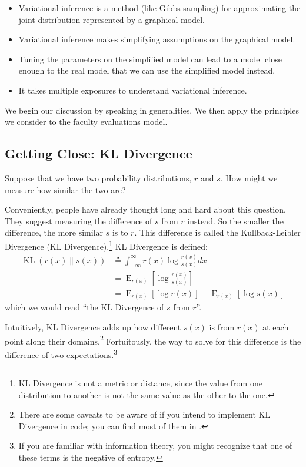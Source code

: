 \documentclass[12pt]{article}
\newcommand{\KL}{\operatorname{KL}}
\newcommand{\E}{\operatorname{E}}
\begin{document}
\begin{itemize}
    \item Variational inference is a method (like Gibbs sampling) for
        approximating the joint distribution represented by a graphical model.
    \item Variational inference makes simplifying assumptions on the graphical
        model.
    \item Tuning the parameters on the simplified model can lead to a model
        close enough to the real model that we can use the simplified model
        instead.
    \item It takes multiple exposures to understand variational inference.
\end{itemize}

We begin our discussion by speaking in generalities.  We then apply the
principles we consider to the faculty evaluations model.

\subsection{Getting Close:  KL Divergence}

Suppose that we have two probability distributions, $r$ and $s$.  How might we
measure how similar the two are?

Conveniently, people have already thought long and hard about this question.
They suggest measuring the difference of $s$ from $r$ instead.  So the smaller
the difference, the more similar $s$ is to $r$.  This difference is called the
Kullback-Leibler Divergence (KL Divergence).\footnote{KL Divergence is not a
metric or distance, since the value from one distribution to another is not the
same value as the other to the one.} KL Divergence is defined:
\begin{align}\label{eq:kldivergence}
    \KL(r(x)\parallel s(x)) &\triangleq \int_{-\infty}^{\infty} r(x)
    \log{\frac{r(x)}{s(x)}}dx
    \nonumber \\
    &= \E_{r(x)}[\log \frac{r(x)}{s(x)}]
    \nonumber \\
    &= \E_{r(x)}[\log r(x)] - \E_{r(x)}[\log s(x)]
\end{align}
which we would read \enquote{the KL Divergence of $s$ from $r$}.

Intuitively, KL Divergence adds up how different $s(x)$ is from $r(x)$ at each
point along their domains.\footnote{There are some caveats to be aware of if you
intend to implement KL Divergence in code; you can find most of them in
\autocite{wikikl}.}  Fortuitously, the way to solve for this difference is the
difference of two expectations.\footnote{If you are familiar with information
theory, you might recognize that one of these terms is the negative of entropy.}
\end{document}
